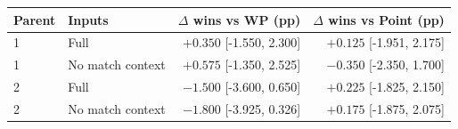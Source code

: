 \begin{tabular}{llrr}
\toprule
Parent & Inputs & $\Delta$ wins vs WP (pp) & $\Delta$ wins vs Point (pp) \\
\midrule
1 & Full & $+0.350$ [-1.550, 2.300] & $+0.125$ [-1.951, 2.175] \\
1 & No match context & $+0.575$ [-1.350, 2.525] & $-0.350$ [-2.350, 1.700] \\
2 & Full & $-1.500$ [-3.600, 0.650] & $+0.225$ [-1.825, 2.150] \\
2 & No match context & $-1.800$ [-3.925, 0.326] & $+0.175$ [-1.875, 2.075] \\
\bottomrule
\end{tabular}

